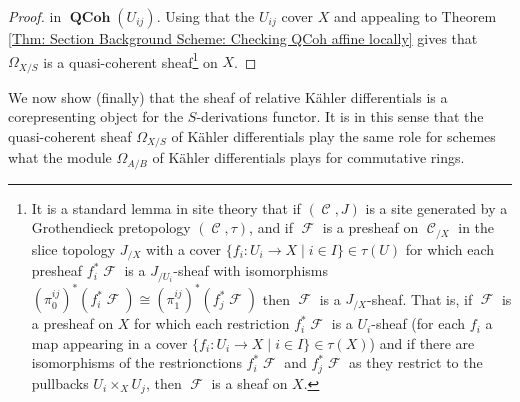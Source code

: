 \documentclass{amsart}
\theoremstyle{definition}
\DeclareMathOperator{\Cscr}{\mathscr{C}}
\DeclareMathOperator{\Fscr}{\mathscr{F}}
\DeclareMathOperator{\QCoh}{\mathbf{QCoh}}
\newcommand{\Kah}[2]{\Omega_{{#1}/{#2}}}
\numberwithin{equation}{subsection}
\begin{document}
\begin{proof}
in $\QCoh(U_{ij})$. Using that the $U_{ij}$ cover $X$ and appealing to Theorem \ref{Thm: Section Background Scheme: Checking QCoh affine locally} gives that  $\Kah{X}{S}$ is a quasi-coherent sheaf\footnote{It is a standard lemma in site theory that if $(\Cscr,J)$ is a site generated by a Grothendieck pretopology $(\Cscr,\tau)$, and if $\Fscr$ is a presheaf on $\Cscr_{/X}$ in the slice topology $J_{/X}$ with a cover $\lbrace f_i:U_i \to X \; | \; i \in I \rbrace \in \tau(U)$ for which each presheaf $f_i^{\ast}\Fscr$ is a $J_{/U_i}$-sheaf with isomorphisms $(\pi_0^{ij})^{\ast}(f_i^{\ast}\Fscr) \cong (\pi_1^{ij})^{\ast}(f_j^{\ast}\Fscr)$ then $\Fscr$ is a $J_{/X}$-sheaf. That is, if $\Fscr$ is a presheaf on $X$ for which each restriction $f_i^{\ast}\Fscr$ is a $U_i$-sheaf (for each $f_i$ a map appearing in a cover $\lbrace f_i:U_i \to X \; | \; i \in I \rbrace \in \tau(X)$) and if there are isomorphisms of the restrionctions $f_i^{\ast}\Fscr$ and $f_j^{\ast}\Fscr$ as they restrict to the pullbacks $U_i \times_X U_j$, then $\Fscr$ is a sheaf on $X$.} on $X$.
\end{proof}

We now show (finally) that the sheaf of relative K{\"a}hler differentials is a corepresenting object for the $S$-derivations functor. It is in this sense that the quasi-coherent sheaf $\Kah{X}{S}$ of K{\"a}hler differentials play the same role for schemes what the module $\Kah{A}{B}$ of K{\"a}hler differentials plays for commutative rings.
\end{document}
